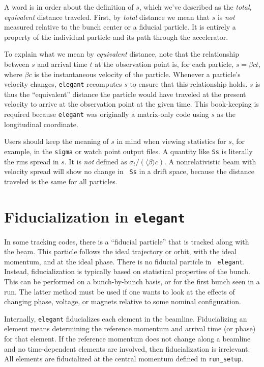 \documentclass[11pt]{article}
\begin{document}
A word is in order about the definition of $s$, which we've described
as the {\em total, equivalent} distance traveled.  First, by {\em
total} distance we mean that $s$ is {\em not} measured relative to the
bunch center or a fiducial particle.  It is entirely a property of the
individual particle and its path through the accelerator.

To explain what we mean by {\em equivalent} distance, note that the
relationship between $s$ and arrival time $t$ at the observation point
is, for each particle, $s = \beta c t$, where $\beta c$ is the
instantaneous velocity of the particle.  Whenever a particle's
velocity changes, {\tt elegant} recomputes $s$ to ensure that this
relationship holds.  $s$ is thus the ``equivalent'' distance the
particle would have traveled at the present velocity to arrive at the
observation point at the given time.  This book-keeping is required
because {\tt elegant} was originally a matrix-only code using $s$ as
the longitudinal coordinate.

Users should keep the meaning of $s$ in mind when viewing statistics
for $s$, for example, in the {\tt sigma} or watch point output files.
A quantity like {\tt Ss} is literally the rms spread in $s$.  It is
{\em not} defined as $\sigma_t/(\langle \beta \rangle c)$.  A
nonrelativistic beam with velocity spread will show no change in {\tt
Ss} in a drift space, because the distance traveled is the same for
all particles.

\section{Fiducialization in {\tt elegant}}

In some tracking codes, there is a ``fiducial particle'' that is
tracked along with the beam.  This particle follows the ideal trajectory or orbit, with the ideal
momentum, and at the ideal phase.  There is no fiducial particle in {\tt
elegant}.  Instead, fiducialization is typically based on statistical properties of 
the bunch.  This can be performed on a bunch-by-bunch basis, or for the first
bunch seen in a run.  The latter method must be used if one wants to look at the
effects of changing phase, voltage, or magnets relative to some nominal configuration.

Internally, {\tt elegant} fiducializes each element in the beamline.
Fiducializing an element means determining the reference momentum and arrival time
(or phase) for that element.   If the reference momentum does not change along a beamline and no time-dependent elements
are involved, then fiducialization is irrelevant.  All elements are
fiducialized at the central momentum defined in \verb|run_setup|.
\end{document}
